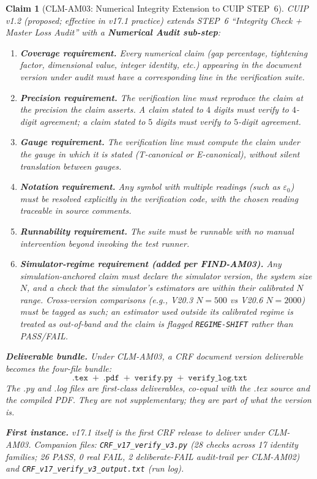 \documentclass[12pt, a4paper]{article}
\newtheorem{claim}{Claim}[section]
\begin{document}
\begin{claim}[CLM-AM03: Numerical Integrity Extension to CUIP STEP~6]
CUIP v1.2 (proposed; effective in v17.1 practice) extends STEP~6
``Integrity Check + Master Loss Audit'' with a \textbf{Numerical Audit
sub-step}:

\begin{enumerate}[leftmargin=*]
\item \textbf{Coverage requirement.} Every numerical claim
  (gap percentage, tightening factor, dimensional value, integer
  identity, etc.) appearing in the document version under audit must
  have a corresponding line in the verification suite.
\item \textbf{Precision requirement.} The verification line must
  reproduce the claim at the precision the claim asserts. A claim
  stated to $4$ digits must verify to $4$-digit agreement; a claim
  stated to $5$ digits must verify to $5$-digit agreement.
\item \textbf{Gauge requirement.} The verification line must compute
  the claim under the gauge in which it is stated (T-canonical or
  E-canonical), without silent translation between gauges.
\item \textbf{Notation requirement.} Any symbol with multiple readings
  (such as $\varepsilon_0$) must be resolved explicitly in the
  verification code, with the chosen reading traceable in source
  comments.
\item \textbf{Runnability requirement.} The suite must be runnable
  with no manual intervention beyond invoking the test runner.
\item \textbf{Simulator-regime requirement (added per FIND-AM03).}
  Any simulation-anchored claim must declare the simulator version,
  the system size $N$, and a check that the simulator's estimators
  are within their calibrated $N$ range. Cross-version comparisons
  (e.g., V20.3 $N=500$ vs V20.6 $N=2000$) must be tagged as such;
  an estimator used outside its calibrated regime is treated as
  out-of-band and the claim is flagged \texttt{REGIME-SHIFT} rather
  than PASS/FAIL.
\end{enumerate}

\textbf{Deliverable bundle.} Under CLM-AM03, a CRF document version
deliverable becomes the four-file bundle:
\[
  \texttt{.tex} \;+\; \texttt{.pdf} \;+\;
  \texttt{verify.py} \;+\; \texttt{verify\_log.txt}
\]
The .py and .log files are first-class deliverables, co-equal with
the .tex source and the compiled PDF. They are not supplementary;
they are part of what the version \emph{is}.

\textbf{First instance.} v17.1 itself is the first CRF release to
deliver under CLM-AM03. Companion files:
\texttt{CRF\_v17\_verify\_v3.py} (28 checks across 17 identity
families; 26 PASS, 0 real FAIL, 2 deliberate-FAIL audit-trail per
CLM-AM02) and \texttt{CRF\_v17\_verify\_v3\_output.txt} (run log).
\end{claim}
\end{document}
